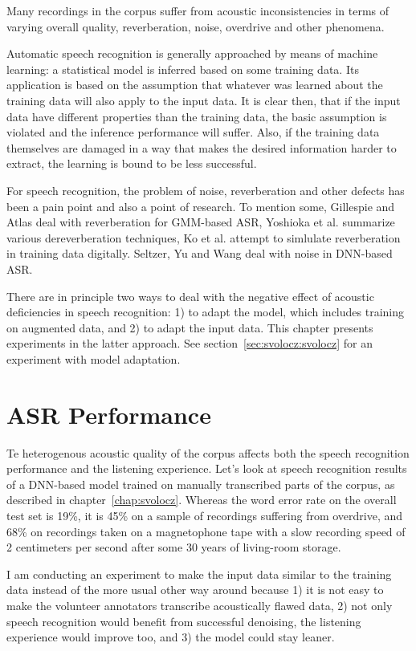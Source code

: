 \documentclass[hidelinks,12pt,a4paper]{report}
\begin{document}
Many recordings in the corpus suffer from
acoustic inconsistencies in terms of varying
overall quality, reverberation, noise, overdrive and other phenomena.

Automatic speech recognition is generally approached by means of machine
learning: a statistical model is inferred based on some training data. Its
application is based on the assumption that whatever was learned about the training
data will also apply to the input data. It is clear then, that if the input
data have different properties than the training data, the basic assumption is
violated and the inference performance will suffer.
Also, if the training data themselves are damaged in a way that makes the desired
information harder to extract, the learning is bound to be less successful.

For speech recognition, the problem of noise, reverberation and other defects
has been a pain point and also a point of research. To mention some, Gillespie
and Atlas\cite{gillespie2002diversity} deal with reverberation for
GMM-based ASR, Yoshioka et al.\cite{reverbmagazine} summarize various
dereverberation techniques, Ko et al.\cite{reverbaugment} attempt to
simlulate reverberation in training data digitally. Seltzer, Yu and
Wang\cite{dnnnoiserobust} deal with noise in DNN-based ASR.

There are in principle two ways to deal with the negative effect of acoustic
deficiencies in speech recognition: 1) to adapt the model, which includes
training on augmented data, and 2) to adapt the input data. This chapter
presents experiments in the latter approach. See
section~\ref{sec:svolocz:svolocz} for an experiment with model adaptation.

\section{ASR Performance}

Te heterogenous acoustic quality of the corpus affects both the speech recognition
performance and the listening experience. Let's look at speech recognition results
of a DNN-based model trained on manually transcribed parts of the corpus, as  described in chapter~\ref{chap:svolocz}. Whereas the word error rate on the
overall test set is 19\%, it is 45\% on a sample of recordings suffering from
overdrive, and 68\% on recordings taken on a magnetophone tape with a slow
recording speed of 2 centimeters per second after some 30 years of living-room
storage.

I am conducting an experiment to make the input data similar to the training
data instead of the more usual other way around because 1) it is not easy to
make the volunteer annotators transcribe acoustically flawed data, 2) not only
speech recognition would benefit from successful denoising, the listening
experience would improve too, and 3) the model could stay leaner.
\end{document}

